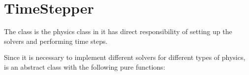 \documentclass[letterpaper,10pt,english]{sphinxmanual}
\begin{document}
\begin{sphinxVerbatim}[commandchars=\\\{\},formatcom=\scriptsize]
   
   

   
   
\end{sphinxVerbatim}


\section{TimeStepper}
\label{\detokenize{Source/TimeStepper:timestepper}}\label{\detokenize{Source/TimeStepper:chap-timestepper}}\label{\detokenize{Source/TimeStepper::doc}}
The  class is the physics class in  \sphinxhyphen{} it has direct responsibility of setting up the solvers and performing time steps.

Since it is necessary to implement different solvers for different types of physics,  is an abstract class with the following pure functions:
\end{document}
